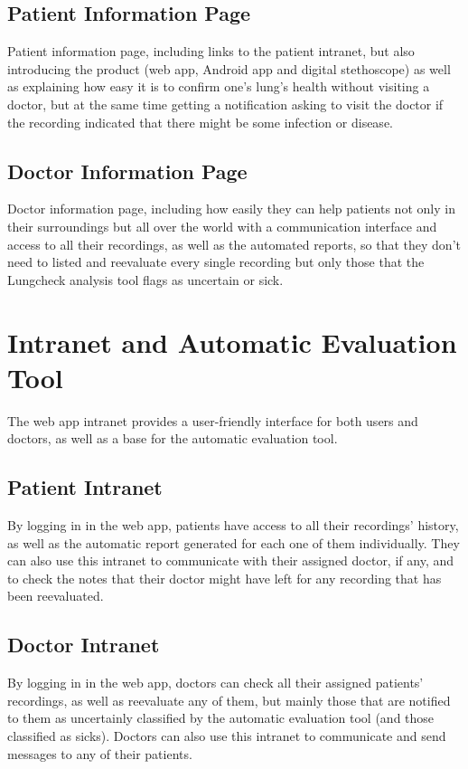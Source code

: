 \documentclass{scrreprt}
\begin{document}
\subsection{Patient Information Page}
Patient information page, including links to the patient intranet, but also introducing the product (web app, Android app and digital stethoscope) as well as explaining how easy it is to confirm one's lung's health without visiting a doctor, but at the same time getting a notification asking to visit the doctor if the recording indicated that there might be some infection or disease.

\subsection{Doctor Information Page}
Doctor information page, including how easily they can help patients not only in their surroundings but all over the world with a communication interface and access to all their recordings, as well as the automated reports, so that they don't need to listed and reevaluate every single recording but only those that the Lungcheck analysis tool flags as uncertain or sick.



\section{Intranet and Automatic Evaluation Tool}
The web app intranet provides a user-friendly interface for both users and doctors, as well as a base for the automatic evaluation tool.

\subsection{Patient Intranet}
By logging in in the web app, patients have access to all their recordings' history, as well as the automatic report generated for each one of them individually. They can also use this intranet to communicate with their assigned doctor, if any, and to check the notes that their doctor might have left for any recording that has been reevaluated.

\subsection{Doctor Intranet}
By logging in in the web app, doctors can check all their assigned patients' recordings, as well as reevaluate any of them, but mainly those that are notified to them as uncertainly classified by the automatic evaluation tool (and those classified as sicks). Doctors can also use this intranet to communicate and send messages to any of their patients.
\end{document}
